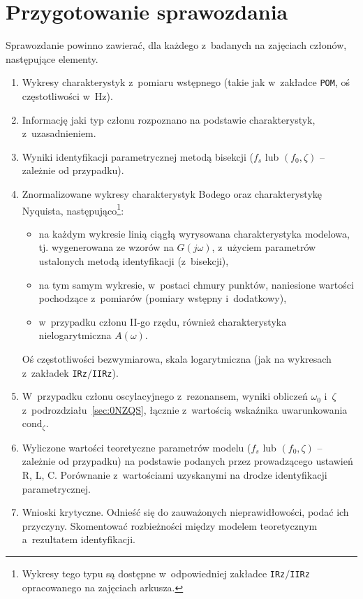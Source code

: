 \documentclass[paper=a4,DIV=12]{lpas}
\begin{document}
\section{Przygotowanie sprawozdania}
\label{sec:TFLLK}

Sprawozdanie powinno zawierać, dla każdego z~badanych na zajęciach członów,
następujące elementy.
\begin{enumerate}
  \item Wykresy charakterystyk z~pomiaru wstępnego (takie jak w~zakładce
    \texttt{POM}, oś częstotliwości w~Hz).
  \item Informację jaki typ członu rozpoznano na podstawie charakterystyk, z~uzasadnieniem.
  \item Wyniki identyfikacji parametrycznej metodą bisekcji ($f_s$ lub $(f_0, \zeta)$ -- zależnie od przypadku).
  \item Znormalizowane wykresy charakterystyk Bodego oraz charakterystykę
    Nyquista, następująco\footnote{Wykresy tego typu są dostępne w~odpowiedniej
    zakładce \texttt{IRz}$/$\texttt{IIRz} opracowanego na zajęciach arkusza.}:
    \begin{itemize}
      \item na każdym wykresie linią ciągłą wyrysowana charakterystyka
        modelowa, tj. wygenerowana ze wzorów na $G(j\omega)$, z~użyciem
        parametrów ustalonych metodą identyfikacji (z~bisekcji),
      \item na tym samym wykresie, w~postaci chmury punktów, naniesione
        wartości pochodzące z~pomiarów (pomiary wstępny i~dodatkowy),
      \item w~przypadku członu II-go rzędu, również charakterystyka
        nielogarytmiczna $A(\omega)$.
    \end{itemize}
    Oś częstotliwości bezwymiarowa, skala logarytmiczna (jak na wykresach
    z~zakładek \texttt{IRz}$/$\texttt{IIRz}).
  \item W~przypadku członu oscylacyjnego z~rezonansem, wyniki obliczeń
    $\omega_0$ i~$\zeta$ z~podrozdziału~\ref{sec:0NZQS}, łącznie z~wartością
    wskaźnika uwarunkowania $\text{cond}_{\zeta}$.
  \item Wyliczone wartości teoretyczne parametrów modelu ($f_s$ lub
    $(f_0,\zeta)$ -- zależnie od przypadku) na podstawie podanych przez
    prowadzącego ustawień R, L, C. Porównanie z~wartościami uzyskanymi na
    drodze identyfikacji parametrycznej.
  \item Wnioski krytyczne. Odnieść się do zauważonych nieprawidłowości, podać
    ich przyczyny. Skomentować rozbieżności między modelem teoretycznym
    a~rezultatem identyfikacji.
\end{enumerate}
\end{document}
